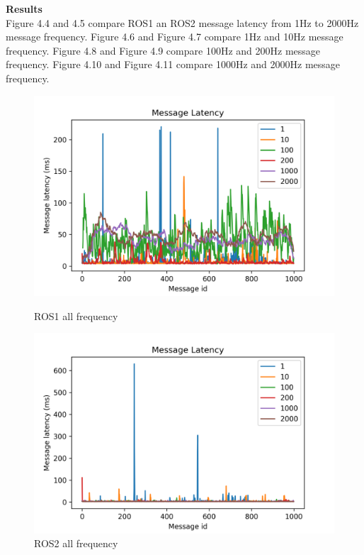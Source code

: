 \documentclass{mproj}
\begin{document}
\textbf{Results} \\
Figure 4.4 and 4.5 compare ROS1 an ROS2 message latency from 1Hz to 2000Hz message frequency. Figure 4.6 and Figure 4.7 compare 1Hz and 10Hz message frequency. Figure 4.8 and Figure 4.9 compare 100Hz and 200Hz message frequency. Figure 4.10 and Figure 4.11 compare 1000Hz and 2000Hz message frequency.

\begin{figure}
\begin{minipage}[h]{0.5\linewidth}
\centering
\includegraphics[width = 1\textwidth]{all.png}
\caption{ROS1 all frequency}
\label{fig:side:a}
\end{minipage}%
\begin{minipage}[h]{0.5\linewidth}
\centering
\includegraphics[width = 1\textwidth]{all2.png}
\caption{ROS2 all frequency}
\label{fig:side:b}
\end{minipage}
\end{figure}
\end{document}
